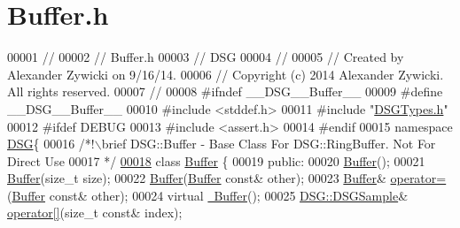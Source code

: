 \hypertarget{_buffer_8h_source}{\section{Buffer.\+h}
\label{_buffer_8h_source}
}

\begin{DoxyCode}
00001 \textcolor{comment}{//}
00002 \textcolor{comment}{//  Buffer.h}
00003 \textcolor{comment}{//  DSG}
00004 \textcolor{comment}{//}
00005 \textcolor{comment}{//  Created by Alexander Zywicki on 9/16/14.}
00006 \textcolor{comment}{//  Copyright (c) 2014 Alexander Zywicki. All rights reserved.}
00007 \textcolor{comment}{//}
00008 \textcolor{preprocessor}{#ifndef \_\_DSG\_\_Buffer\_\_}
00009 \textcolor{preprocessor}{#define \_\_DSG\_\_Buffer\_\_}
00010 \textcolor{preprocessor}{#include <stddef.h>}
00011 \textcolor{preprocessor}{#include "\hyperlink{_d_s_g_types_8h}{DSGTypes.h}"}
00012 \textcolor{preprocessor}{#ifdef DEBUG}
00013 \textcolor{preprocessor}{#include <assert.h>}
00014 \textcolor{preprocessor}{#endif}
00015 \textcolor{keyword}{namespace }\hyperlink{namespace_d_s_g}{DSG}\{\textcolor{comment}{}
00016 \textcolor{comment}{    /*!\(\backslash\)brief DSG::Buffer - Base Class For DSG::RingBuffer. Not For Direct Use}
00017 \textcolor{comment}{     */}
\hypertarget{_buffer_8h_source_l00018}{}\hyperlink{class_d_s_g_1_1_buffer}{00018}     \textcolor{keyword}{class }\hyperlink{class_d_s_g_1_1_buffer}{Buffer} \{
00019     \textcolor{keyword}{public}:
00020         \hyperlink{class_d_s_g_1_1_buffer_aa764dd8c389dcff51de08cb81fafeb86}{Buffer}();
00021         \hyperlink{class_d_s_g_1_1_buffer_aa764dd8c389dcff51de08cb81fafeb86}{Buffer}(\textcolor{keywordtype}{size\_t} size);
00022         \hyperlink{class_d_s_g_1_1_buffer_aa764dd8c389dcff51de08cb81fafeb86}{Buffer}(\hyperlink{class_d_s_g_1_1_buffer}{Buffer} \textcolor{keyword}{const}& other);
00023         \hyperlink{class_d_s_g_1_1_buffer}{Buffer}& \hyperlink{class_d_s_g_1_1_buffer_a977d572a7d402ff6bf991d7c5c0cc6a7}{operator=}(\hyperlink{class_d_s_g_1_1_buffer}{Buffer} \textcolor{keyword}{const}& other);
00024         \textcolor{keyword}{virtual} \hyperlink{class_d_s_g_1_1_buffer_a619fc41bf263a419da1a19254e194101}{~Buffer}();
00025         \hyperlink{namespace_d_s_g_ac39a94cd27ebcd9c1e7502d0c624894a}{DSG::DSGSample}& \hyperlink{class_d_s_g_1_1_buffer_a5358d81096cd0801e4fce7851809b3ef}{operator[]}(\textcolor{keywordtype}{size\_t} \textcolor{keyword}{const}& index);

\end{DoxyCode}
